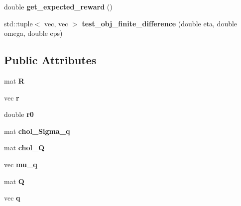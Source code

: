 \begin{DoxyCompactItemize}
\item 
double {\bfseries get\+\_\+expected\+\_\+reward} ()\hypertarget{classMore_a37becd406f53d7d4ea39a63ecddaff65}{}\label{classMore_a37becd406f53d7d4ea39a63ecddaff65}

\item 
std\+::tuple$<$ vec, vec $>$ {\bfseries test\+\_\+obj\+\_\+finite\+\_\+difference} (double eta, double omega, double eps)\hypertarget{classMore_a46f6dafc240f9c318734ed7ffbee73b7}{}\label{classMore_a46f6dafc240f9c318734ed7ffbee73b7}

\end{DoxyCompactItemize}
\subsection*{Public Attributes}
\begin{DoxyCompactItemize}
\item 
mat {\bfseries R}\hypertarget{classMore_a433b935746584a3f575aaad0a4dff676}{}\label{classMore_a433b935746584a3f575aaad0a4dff676}

\item 
vec {\bfseries r}\hypertarget{classMore_abd58e2c611fcd0ba19ff1827de13a079}{}\label{classMore_abd58e2c611fcd0ba19ff1827de13a079}

\item 
double {\bfseries r0}\hypertarget{classMore_af13af649eb7ab142565c7138654638e7}{}\label{classMore_af13af649eb7ab142565c7138654638e7}

\item 
mat {\bfseries chol\+\_\+\+Sigma\+\_\+q}\hypertarget{classMore_aea252b6789078d0db3151f7b91d6b14d}{}\label{classMore_aea252b6789078d0db3151f7b91d6b14d}

\item 
mat {\bfseries chol\+\_\+Q}\hypertarget{classMore_a4d98cd1335ad9eb1e6eb3dcb491392f9}{}\label{classMore_a4d98cd1335ad9eb1e6eb3dcb491392f9}

\item 
vec {\bfseries mu\+\_\+q}\hypertarget{classMore_a44d06b5bef43614da37f03cee8b49f7b}{}\label{classMore_a44d06b5bef43614da37f03cee8b49f7b}

\item 
mat {\bfseries Q}\hypertarget{classMore_a5a81408e0bb2ac67f25f7dc80fdb638c}{}\label{classMore_a5a81408e0bb2ac67f25f7dc80fdb638c}

\item 
vec {\bfseries q}\hypertarget{classMore_a646ac6513d1490b21f20c869eff874d9}{}\label{classMore_a646ac6513d1490b21f20c869eff874d9}


\end{DoxyCompactItemize}
